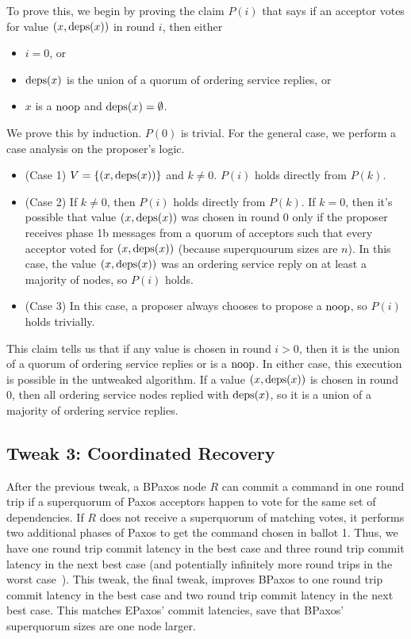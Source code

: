 \documentclass{mwhittaker}
\begin{document}
To prove this, we begin by proving the claim $P(i)$ that says if an acceptor
votes for value $(x, \text{deps}(x))$ in round $i$, then either
\begin{itemize}
  \item $i = 0$, or
  \item $\text{deps}(x)$ is the union of a quorum of ordering service replies, or
  \item $x$ is a $\text{noop}$ and $\text{deps}(x) = \emptyset{}$.
\end{itemize}
We prove this by induction. $P(0)$ is trivial. For the general case, we perform
a case analysis on the proposer's logic.
\begin{itemize}
  \item (Case 1)
    $V = \{(x, \text{deps}(x))\}$ and $k \neq 0$. $P(i)$ holds directly from
    $P(k)$.

  \item (Case 2)
    If $k \neq 0$, then $P(i)$ holds directly from $P(k)$. If $k = 0$, then
    it's possible that value $(x, \text{deps}(x))$ was chosen in round $0$ only if
    the proposer receives phase 1b messages from a quorum of acceptors such
    that every acceptor voted for $(x, \text{deps}(x))$ (because superquourum sizes
    are $n$). In this case, the value $(x, \text{deps}(x))$ was an ordering service
    reply on at least a majority of nodes, so $P(i)$ holds.

  \item (Case 3)
    In this case, a proposer always chooses to propose a $\text{noop}$, so $P(i)$
    holds trivially.
\end{itemize}

This claim tells us that if any value is chosen in round $i > 0$, then it is
the union of a quorum of ordering service replies or is a $\text{noop}$. In either
case, this execution is possible in the untweaked algorithm. If a value $(x,
\text{deps}(x))$ is chosen in round $0$, then all ordering service nodes replied with
$\text{deps}(x)$, so it is a union of a majority of ordering service replies.

\subsection{Tweak 3: Coordinated Recovery}
After the previous tweak, a BPaxos node $R$ can commit a command in one round
trip if a superquorum of Paxos acceptors happen to vote for the same set of
dependencies. If $R$ does not receive a superquorum of matching votes, it
performs two additional phases of Paxos to get the command chosen in ballot 1.
Thus, we have one round trip commit latency in the best case and three round
trip commit latency in the next best case (and potentially infinitely more
round trips in the worst case~\cite{fischer1982impossibility}). This tweak, the
final tweak, improves BPaxos to one round trip commit latency in the best case
and two round trip commit latency in the next best case. This matches EPaxos'
commit latencies, save that BPaxos' superquorum sizes are one node larger.
\end{document}
